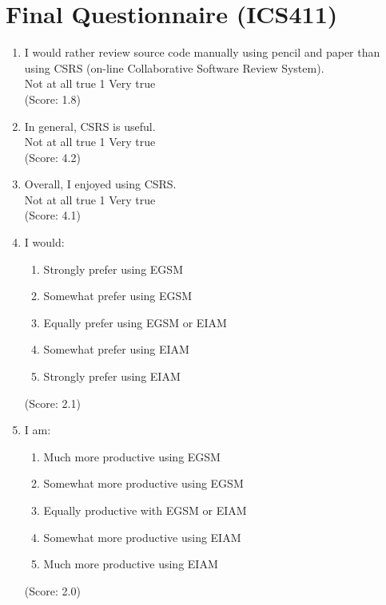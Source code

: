
\chapter{Final Questionnaire (ICS411)}

\begin{enumerate}

\item  I would rather review source code manually using pencil and paper than
using CSRS (on-line Collaborative Software Review System).
\\
Not at all true \hfill 1     \hfill Very true\\
(Score: 1.8)

\item  In general, CSRS is useful.
\\
Not at all true \hfill 1     \hfill Very true\\
(Score: 4.2)

\item  Overall, I enjoyed using CSRS.
\\
Not at all true \hfill 1    
\hfill Very true\\
(Score: 4.1)

\item I would:
   \begin{enumerate}
   \item[(1)]Strongly prefer using EGSM
   \item[(2)]Somewhat prefer using EGSM
   \item[(3)]Equally prefer using EGSM or EIAM
   \item[(4)]Somewhat prefer using EIAM
   \item[(5)]Strongly prefer using EIAM
   \end{enumerate}
(Score: 2.1)

\item I am:
   \begin{enumerate}
     \item[(1)] Much more productive using EGSM
     \item[(2)] Somewhat more productive using EGSM
     \item[(3)] Equally productive with EGSM or EIAM
     \item[(4)] Somewhat more productive using EIAM
     \item[(5)] Much more productive using EIAM
    \end{enumerate}   
(Score: 2.0)


\end{enumerate}
